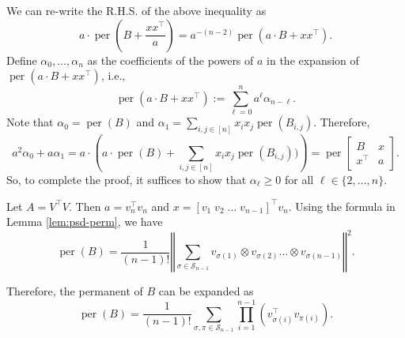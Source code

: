 \documentclass[11pt]{article}
\makeatletter
\theoremstyle{definition}
\newenvironment{proof}[1][\protect\proofname]{\par
	\normalfont\topsep6\p@\@plus6\p@\relax
	\trivlist
	\itemindent\parindent        %
	\item[\hskip\labelsep\scshape #1]\ignorespaces
}{%
	\endtrivlist\@endpefalse
}
\providecommand{\proofname}{Proof}
\DeclareMathOperator{\per}{per}
\newcommand{\norm}[1]{\left\Vert#1\right\Vert}           %
\makeatother
\begin{document}
\begin{proof}
We can re-write the R.H.S. of the above inequality as
\begin{equation*}
     a \cdot \per\left( B + \frac{xx^\top}{a} \right) = a^{-(n-2)} \per\left( a \cdot B + xx^\top \right).
\end{equation*}
Define $\alpha_0, \ldots, \alpha_n$ as the coefficients of the powers of $a$ in the expansion of $\per( a \cdot B + xx^\top )$, i.e.,
\begin{equation*}
    \per\left( a \cdot B + xx^\top \right) := \sum_{\ell = 0}^n a^\ell \alpha_{n-\ell}.
\end{equation*}
Note that $\alpha_0 = \per(B)$ and $ \alpha_1 = \sum_{i,j \in [n]} x_i x_j \per(B_{i,j})$. 
Therefore, 
\begin{equation*}
    a^2 \alpha_0 + a \alpha_1 = a \cdot \left( a \cdot \per(B) + \sum_{i,j \in [n]} x_i x_j \per(B_{i,j}))\right) = \per\begin{bmatrix}
        B & x \\
        x^\top & a
    \end{bmatrix}.
\end{equation*}
So, to complete the proof, it suffices to show that $\alpha_\ell \geq 0$ for all $\ell \in \{2, \ldots, n\}$.


Let $A = V^\top V$. Then $a = v_n^\top v_n$ and $x = [v_1 \; v_2 \; \ldots \;v_{n-1}]^\top v_n$.
    Using the formula in Lemma \ref{lem:psd-perm}, we have
    \begin{equation*}
        \per(B) = \frac{1}{(n-1)!} \norm{\sum_{\sigma \in \mathcal{S}_{n-1}} v_{\sigma(1)} \otimes v_{\sigma(2)} \ldots \otimes v_{\sigma(n-1)} }^2.
    \end{equation*}


Therefore, the permanent of $B$ can be expanded as 
\begin{equation*}
        \per(B) = \frac{1}{(n-1)!} \sum_{\sigma, \pi \in \mathcal{S}_{n-1}} \prod_{i=1}^{n-1} (v_{\sigma(i)}^\top v_{\pi(i)}). 
\end{equation*}


\end{proof}
\end{document}

